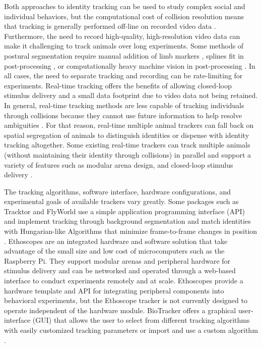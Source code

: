 \documentclass[10pt]{article}
\begin{document}
\begin{multicols}{2}
Both approaches to identity tracking can be used to study complex social and individual behaviors, but the computational cost of collision resolution means that tracking is generally performed off-line on recorded video data \cite{Liu_A_2018}. Furthermore, the need to record high-quality, high-resolution video data can make it challenging to track animals over long experiments. Some methods of postural segmentation require manual addition of limb markers \cite{Kain_Leg_2013}, splines fit in post-processing \cite{Uhlmann_FlyLimbTracker_2017}, or computationally heavy machine vision in post-processing \cite{Mathis_DeepLabCut_2018,Pereira_Fast_2018,romero-ferrero_2019}. In all cases, the need to separate tracking and recording can be rate-limiting for experiments. Real-time tracking offers the benefits of allowing closed-loop stimulus delivery and a small data footprint due to video data not being retained. In general, real-time tracking methods are less capable of tracking individuals through collisions because they cannot use future information to help resolve ambiguities \cite{Itskovits_A_2017}. For that reason, real-time multiple animal trackers can fall back on spatial segregation of animals to distinguish identities or dispense with identity tracking altogether\cite{Liu_A_2018,Scaplen_Automated_2019}. Some existing real-time trackers can track multiple animals (without maintaining their identity through collisions) in parallel and support a variety of features such as modular arena design, and closed-loop stimulus delivery \cite{Geissmann_Ethoscopes_2017,Straw_Multi_2010,Stowers_Virtual_2017,Chagas_The_2017}.

The tracking algorithms, software interface, hardware configurations, and experimental goals of available trackers vary greatly. Some packages such as Tracktor and FlyWorld use a simple application programming interface (API) and implement tracking through background segmentation and match identities with Hungarian-like Algorithms that minimize frame-to-frame changes in position \cite{Kuhn_The_1955,Rodriguez_ToxId_2017,Liu_A_2018}. Ethoscopes are an integrated hardware and software solution that take advantage of the small size and low cost of microcomputers such as the Raspberry Pi. They support modular arenas and peripheral hardware for stimulus delivery \cite{Geissmann_Ethoscopes_2017} and can be networked and operated through a web-based interface to conduct experiments remotely and at scale. Ethoscopes provide a hardware template and API for integrating peripheral components into behavioral experiments, but the Ethoscope tracker is not currently designed to operate independent of the hardware module. BioTracker offers a graphical user-interface (GUI) that allows the user to select from different tracking algorithms with easily customized tracking parameters or import and use a custom algorithm \cite{Mnck_BioTracker_2018}. 


\end{multicols}
\end{document}
